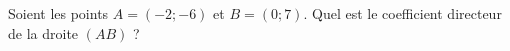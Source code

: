 
\begin{exercice}\label{exosmath-0130}

Soient les points \( A=(-2;-6)\) et \( B=(0;7)\). Quel est le coefficient directeur de la droite \( (AB)\) ?

\end{exercice}
